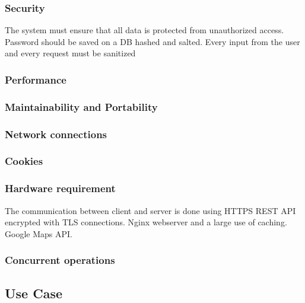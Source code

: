 \begin{itemize}
\subsubsection{Security}

The system must ensure that all data is protected from unauthorized
access. Password should be saved on a DB hashed and salted.
Every input from the user and every request must be sanitized 

\end{itemize}

\pagebreak{}




\subsubsection{Performance}


\subsubsection{Maintainability and Portability}




\subsubsection{Network connections}


\subsubsection{Cookies}



\subsubsection{Hardware requirement}
The communication between client and server is done using HTTPS REST API encrypted with TLS connections.
Nginx webserver and a large use of caching.
Google Maps API.



\subsubsection{Concurrent operations}

\pagebreak
\subsection{Use Case}

